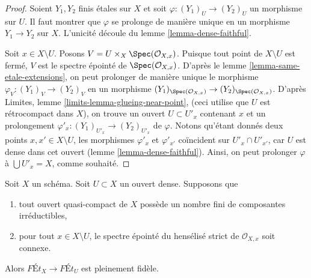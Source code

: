 \begin{proof}
Soient $Y_1, Y_2$ finis étales sur $X$ et soit
$\varphi : (Y_1)_U \to (Y_2)_U$ un morphisme sur $U$. Il faut montrer que
$\varphi$ se prolonge de manière unique en un morphisme $Y_1 \to Y_2$ sur $X$.
L'unicité découle du lemme \ref{lemma-dense-faithful}.

\medskip\noindent
Soit $x \in X \setminus U$. Posons $V = U \times_X \Spec(\mathcal{O}_{X, x})$.
Puisque tout point de $X \setminus U$ est fermé, $V$ est le spectre épointé
de $\Spec(\mathcal{O}_{X, x})$. D'après le
lemme \ref{lemma-same-etale-extensions},
on peut prolonger de manière unique le morphisme $\varphi_V : (Y_1)_V \to (Y_2)_V$
en un morphisme
$(Y_1)_{\Spec(\mathcal{O}_{X, x})} \to (Y_2)_{\Spec(\mathcal{O}_{X, x})}$.
D'après Limites, lemme \ref{limits-lemma-glueing-near-point},
(ceci utilise que $U$ est rétrocompact dans $X$),
on trouve un ouvert $U \subset U'_x$ contenant $x$ et un prolongement
$\varphi'_x : (Y_1)_{U'_x} \to (Y_2)_{U'_x}$ de $\varphi$.
Notons qu'étant donnés deux points $x, x' \in X \setminus U$, les
morphismes $\varphi'_x$ et $\varphi'_{x'}$ coïncident sur
$U'_x \cap U'_{x'}$, car $U$ est dense dans cet ouvert
(lemme \ref{lemma-dense-faithful}). Ainsi, on peut prolonger $\varphi$
à $\bigcup U'_x = X$, comme souhaité.
\end{proof}

\begin{lemma}
\label{lemma-quasi-compact-dense-open-connected-at-infinity}
Soit $X$ un schéma. Soit $U \subset X$ un ouvert dense. Supposons que
\begin{enumerate}
\item tout ouvert quasi-compact de $X$ possède un nombre fini de
composantes irréductibles,
\item pour tout $x \in X \setminus U$, le spectre épointé du
hensélisé strict de $\mathcal{O}_{X, x}$ soit connexe.
\end{enumerate}
Alors $\textit{F\'Et}_X \to \textit{F\'Et}_U$ est pleinement fidèle.
\end{lemma}

